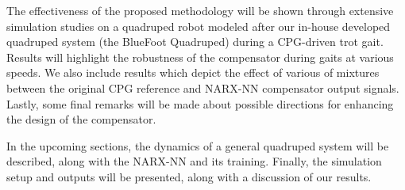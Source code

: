The effectiveness of the proposed methodology will be shown through extensive simulation studies on a quadruped robot modeled after our in-house developed quadruped system (the BlueFoot Quadruped) during a CPG-driven trot gait. Results will highlight the robustness of the compensator during gaits at various speeds. We also include results which depict the effect of various of mixtures between the original CPG reference and NARX-NN compensator output signals. Lastly, some final remarks will be made about possible directions for enhancing the design of the compensator.

In the upcoming sections, the dynamics of a general quadruped system will be described, along with the NARX-NN and its training. Finally, the simulation setup and outputs will be presented, along with a discussion of our results.